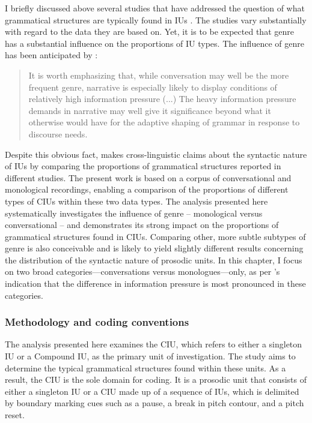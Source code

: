 I briefly discussed above several studies that have addressed the question of what grammatical structures are typically found in IUs \citep[]{Croft_1995, Croft_2007, Tao_1996, Park_2002, Schuetze-Coburn1991, Schuetze-Coburn1994, Matsumoto_2003, Iwasaki1996Thai, IwasakiTao1993comparative, Wouk_2008}. The studies vary substantially with regard to the data they are based on. Yet, it is to be expected that genre has a substantial influence on the proportions of IU types. The influence of genre has been anticipated by \citet[836]{du1987discourse}:
\begin{quotation}
	It is worth emphasizing that, while conversation may well be the more frequent genre, narrative is especially likely to display conditions of relatively high information pressure (...) The heavy information pressure demands in narrative may well give it significance beyond what it otherwise would have for the adaptive shaping of grammar in response to discourse needs.
\end{quotation}



Despite this obvious fact, \citet[12]{Croft_2007} makes cross-linguistic claims about the syntactic nature of IUs by comparing the proportions of grammatical structures reported in different studies. The present work is based on a corpus of conversational and monological recordings, enabling a comparison of the proportions of different types of CIUs within these two data types. The analysis presented here systematically investigates the influence of genre -- monological versus conversational -- and demonstrates its strong impact on the proportions of grammatical structures found in CIUs. Comparing other, more subtle subtypes of genre is also conceivable and is likely to yield slightly different results concerning the distribution of the syntactic nature of prosodic units. In this chapter, I focus on two broad categories---conversations versus monologues---only, as per \citeauthor{du1987discourse}'s \citeyear{du1987discourse} indication  that the difference in information pressure is most pronounced in these categories.





\subsubsection{Methodology and coding conventions}
\label{sec:methodology-and-coding-conventions}


The analysis presented here examines the CIU, which refers to either a singleton IU or a Compound IU, as the primary unit of investigation. The study aims to determine the typical grammatical structures found within these units. As a result, the CIU is the sole domain for coding. It is a prosodic unit that consists of either a singleton IU or a CIU made up of a sequence of IUs, which is delimited by boundary marking cues such as a pause, a break in pitch contour, and a pitch reset. 


